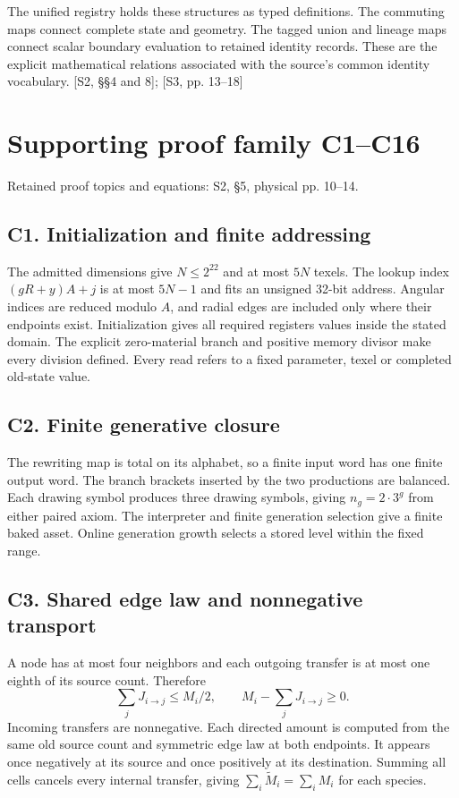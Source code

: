 \documentclass[11pt,a4paper]{article}
\numberwithin{equation}{section}
\newcommand{\newsec}[1]{\clearpage\section{#1}}
\newcommand{\src}[2]{{\sffamily\small\color{slate}[#1, #2]}}
\newcommand{\origin}[1]{{\sffamily\small\color{slate}#1}\par\vspace{3pt}}
\begin{document}
The unified registry holds these structures as typed definitions. The commuting maps connect complete state and geometry. The tagged union and lineage maps connect scalar boundary evaluation to retained identity records. These are the explicit mathematical relations associated with the source's common identity vocabulary. \src{S2}{§§4 and 8}; \src{S3}{pp. 13--18}

\newsec{Supporting proof family C1--C16}
\label{sec:proofs}
\origin{Retained proof topics and equations: S2, §5, physical pp. 10--14.}

\subsection*{C1. Initialization and finite addressing}
The admitted dimensions give $N\le2^{22}$ and at most $5N$ texels. The lookup index $(gR+y)A+j$ is at most $5N-1$ and fits an unsigned 32-bit address. Angular indices are reduced modulo $A$, and radial edges are included only where their endpoints exist. Initialization gives all required registers values inside the stated domain. The explicit zero-material branch and positive memory divisor make every division defined. Every read refers to a fixed parameter, texel or completed old-state value.

\subsection*{C2. Finite generative closure}
The rewriting map is total on its alphabet, so a finite input word has one finite output word. The branch brackets inserted by the two productions are balanced. Each drawing symbol produces three drawing symbols, giving $n_g=2\cdot3^g$ from either paired axiom. The interpreter and finite generation selection give a finite baked asset. Online generation growth selects a stored level within the fixed range.

\subsection*{C3. Shared edge law and nonnegative transport}
A node has at most four neighbors and each outgoing transfer is at most one eighth of its source count. Therefore
\begin{equation}
\sum_jJ_{i\to j}\le M_i/2,
\qquad M_i-\sum_jJ_{i\to j}\ge0.
\end{equation}
Incoming transfers are nonnegative. Each directed amount is computed from the same old source count and symmetric edge law at both endpoints. It appears once negatively at its source and once positively at its destination. Summing all cells cancels every internal transfer, giving $\sum_i\widetilde M_i=\sum_iM_i$ for each species.
\end{document}
